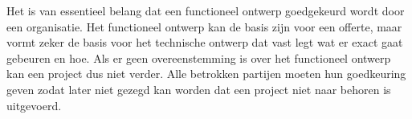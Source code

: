 
Het is van essentieel belang dat een functioneel ontwerp goedgekeurd wordt door een organisatie. Het functioneel ontwerp kan de basis zijn voor een offerte, maar vormt zeker de basis voor het technische ontwerp dat vast legt wat er exact gaat gebeuren en hoe. Als er geen overeenstemming is over het functioneel ontwerp kan een project dus niet verder. Alle betrokken partijen moeten hun goedkeuring geven zodat later niet gezegd kan worden dat een project niet naar behoren is uitgevoerd.

